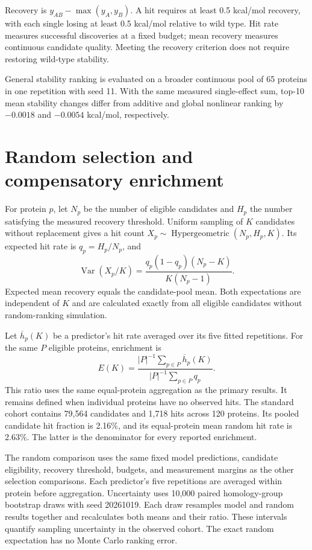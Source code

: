 \documentclass{llncs}
\begin{document}
Recovery is $y_{AB}-\max(y_A,y_B)$. A hit requires at least 0.5 kcal/mol recovery, with each single losing at least 0.5 kcal/mol relative to wild type. Hit rate measures successful discoveries at a fixed budget; mean recovery measures continuous candidate quality. Meeting the recovery criterion does not require restoring wild-type stability.

General stability ranking is evaluated on a broader continuous pool of 65 proteins in one repetition with seed 11. With the same measured single-effect sum, top-10 mean stability changes differ from additive and global nonlinear ranking by $-0.0018$ and $-0.0054$ kcal/mol, respectively.

\section{Random selection and compensatory enrichment}
\label{app:random}

For protein $p$, let $N_p$ be the number of eligible candidates and $H_p$ the number satisfying the measured recovery threshold. Uniform sampling of $K$ candidates without replacement gives a hit count $X_p\sim\operatorname{Hypergeometric}(N_p,H_p,K)$. Its expected hit rate is $q_p=H_p/N_p$, and
\begin{equation}
\operatorname{Var}(X_p/K)=\frac{q_p(1-q_p)(N_p-K)}{K(N_p-1)}.
\end{equation}
Expected mean recovery equals the candidate-pool mean. Both expectations are independent of $K$ and are calculated exactly from all eligible candidates without random-ranking simulation.

Let $\overline h_p(K)$ be a predictor's hit rate averaged over its five fitted repetitions. For the same $P$ eligible proteins, enrichment is
\begin{equation}
E(K)=\frac{|P|^{-1}\sum_{p\in P}\overline h_p(K)}{|P|^{-1}\sum_{p\in P}q_p}.
\end{equation}
This ratio uses the same equal-protein aggregation as the primary results. It remains defined when individual proteins have no observed hits. The standard cohort contains 79,564 candidates and 1,718 hits across 120 proteins. Its pooled candidate hit fraction is 2.16\%, and its equal-protein mean random hit rate is 2.63\%. The latter is the denominator for every reported enrichment.

The random comparison uses the same fixed model predictions, candidate eligibility, recovery threshold, budgets, and measurement margins as the other selection comparisons. Each predictor's five repetitions are averaged within protein before aggregation. Uncertainty uses 10,000 paired homology-group bootstrap draws with seed 20261019. Each draw resamples model and random results together and recalculates both means and their ratio. These intervals quantify sampling uncertainty in the observed cohort. The exact random expectation has no Monte Carlo ranking error.
\end{document}
